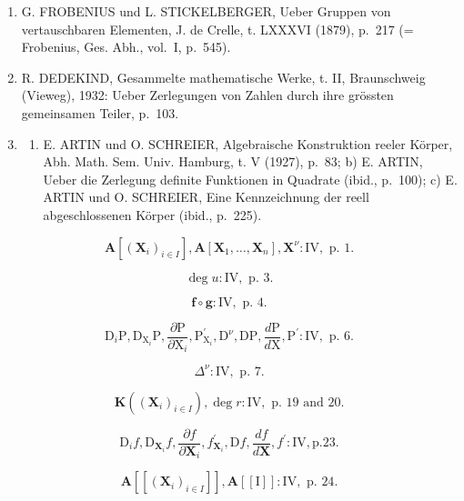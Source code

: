 \begin{enumerate}
\item
  G. FROBENIUS und L. STICKELBERGER, Ueber Gruppen von vertauschbaren Elementen, J. de Crelle, t. LXXXVI (1879), p.~217 (= Frobenius, Ges. Abh., vol.~I, p.~545).
\item
  R. DEDEKIND, Gesammelte mathematische Werke, t. II, Braunschweig (Vieweg), 1932: Ueber Zerlegungen von Zahlen durch ihre grössten gemeinsamen Teiler, p.~103.
\item
  \begin{enumerate}
  \def\labelenumii{\alph{enumii})}
  \tightlist
  \item
    E. ARTIN und O. SCHREIER, Algebraische Konstruktion reeler Körper, Abh. Math. Sem. Univ. Hamburg, t. V (1927), p.~83; b) E. ARTIN, Ueber die Zerlegung definite Funktionen in Quadrate (ibid., p.~100); c) E. ARTIN und O. SCHREIER, Eine Kennzeichnung der reell abgeschlossenen Körper (ibid., p.~225).
  \end{enumerate}
\end{enumerate}


\[
\mathbf {A} \left[ \left(\mathbf {X} _ {i}\right) _ {i \in I} \right], \mathbf {A} \left[ \mathbf {X} _ {1}, \dots , \mathbf {X} _ {n} \right], \mathbf {X} ^ {\nu}: \mathrm{IV}, \text { p. } 1.
\]

\[
\deg u: \mathrm{IV}, \text { p. } 3.
\]

\[
\mathbf {f} \circ \mathbf {g}: \mathrm{IV}, \text { p. } 4.
\]

\[
\mathrm{D} _ {i} \mathrm{P}, \mathrm{D} _ {\mathrm{X} _ {i}} \mathrm{P}, \frac {\partial \mathrm{P}}{\partial \mathrm{X} _ {i}}, \mathrm{P} _ {\mathrm{X} _ {i}} ^ {\prime}, \mathrm{D} ^ {\nu}, \mathrm{DP}, \frac {d \mathrm{P}}{d \mathrm{X}}, \mathrm{P} ^ {\prime}: \mathrm{IV}, \text { p. } 6.
\]

\[
\Delta^ {\nu}: \mathrm{IV}, \text { p. } 7.
\]

\[
\mathbf {K} ((\mathbf {X} _ {i}) _ {i \in I}), \deg r: \mathrm{IV}, \text { p. } 19 \text { and } 20.
\]

\[
\mathrm{D} _ {i} f, \mathrm{D} _ {\mathbf {X} _ {i}} f, \frac {\partial f}{\partial \mathbf {X} _ {i}}, f _ {\mathbf {X} _ {i}} ^ {\prime}, \mathrm{D} f, \frac {d f}{d \mathbf {X}}, f ^ {\prime}: \mathrm{IV}, \text {p.} 23.
\]

\[
\mathbf {A} \left[ \left[ \left(\mathbf {X} _ {i}\right) _ {i \in I} \right] \right], \mathbf {A} \left[ [ \mathrm{I} ] \right]: \mathrm{IV}, \text { p. } 24.
\]

